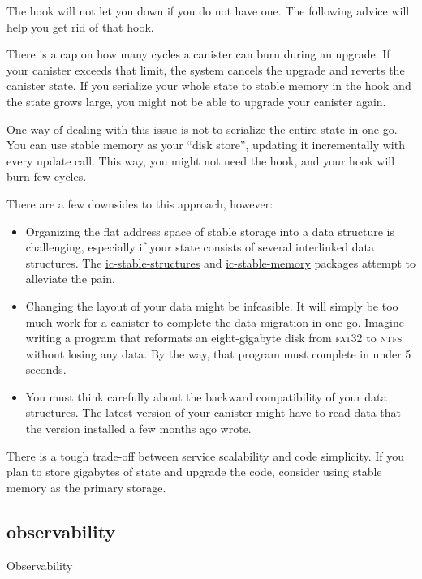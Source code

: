 \documentclass{article}
\begin{document}
The  hook will not let you down if you do not have one.
The following advice will help you get rid of that hook.


There is a cap on how many cycles a canister can burn during an upgrade.
If your canister exceeds that limit, the system cancels the upgrade and reverts the canister state.
If you serialize your whole state to stable memory in the  hook and the state grows large, you might not be able to upgrade your canister again.

One way of dealing with this issue is not to serialize the entire state in one go.
You can use stable memory as your ``disk store'', updating it incrementally with every update call.
This way, you might not need the  hook, and your  hook will burn few cycles.

There are a few downsides to this approach, however:
\begin{itemize}
\item 
  Organizing the flat address space of stable storage into a data structure is challenging, especially if your state consists of several interlinked data structures.
  The \href{https://github.com/dfinity/stable-structures}{ic-stable-structures} and \href{https://github.com/seniorjoinu/ic-stable-memory}{ic-stable-memory} packages attempt to alleviate the pain.
\item 
  Changing the layout of your data might be infeasible.
  It will simply be too much work for a canister to complete the data migration in one go.
  Imagine writing a program that reformats an eight-gigabyte disk from \textsc{fat32} to \textsc{ntfs} without losing any data.
  By the way, that program must complete in under 5 seconds.
\item 
  You must think carefully about the backward compatibility of your data structures.
  The latest version of your canister might have to read data that the version installed a few months ago wrote.
\end{itemize}

There is a tough trade-off between service scalability and code simplicity.
If you plan to store gigabytes of state and upgrade the code, consider using stable memory as the primary storage.

\subsection{observability}{Observability}
\end{document}
